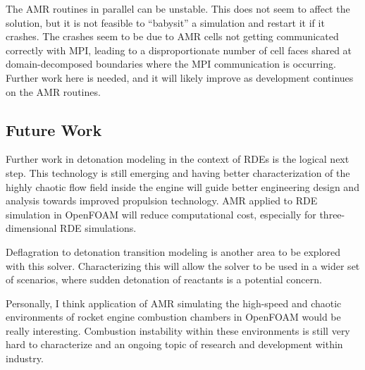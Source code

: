 The AMR routines in parallel can be unstable. This does not seem to affect the solution, but it is not feasible to ``babysit'' a simulation and restart it if it crashes. The crashes seem to be due to AMR cells not getting communicated correctly with MPI, leading to a disproportionate number of cell faces shared at domain-decomposed boundaries where the MPI communication is occurring. Further work here is needed, and it will likely improve as development continues on the AMR routines. 

\subsection{Future Work}
Further work in detonation modeling in the context of RDEs is the logical next step. This technology is still emerging and having better characterization of the highly chaotic flow field inside the engine will guide better engineering design and analysis towards improved propulsion technology. AMR applied to RDE simulation in OpenFOAM will reduce computational cost, especially for three-dimensional RDE simulations. 

Deflagration to detonation transition modeling is another area to be explored with this solver. Characterizing this will allow the solver to be used in a wider set of scenarios, where sudden detonation of reactants is a potential concern. 

Personally, I think application of AMR simulating the high-speed and chaotic environments of rocket engine combustion chambers in OpenFOAM would be really interesting. Combustion instability within these environments is still very hard to characterize and an ongoing topic of research and development within industry. 

